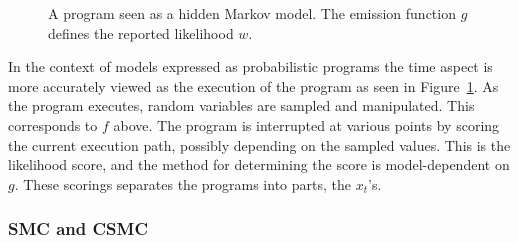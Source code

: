 \begin{figure}[h!]
\begin{center}
\end{center}
\caption{A program seen as a hidden Markov model. The emission function $g$ defines the reported likelihood $w$.}
\label{fig:hmmprog}
\end{figure}


In the context of models expressed as probabilistic programs the time aspect is more accurately viewed as the execution of the program as seen in Figure~\ref{fig:hmmprog}. As the program executes, random variables are sampled and manipulated. This corresponds to $f$ above. The program is interrupted at various points by scoring the current execution path, possibly depending on the sampled values. This is the likelihood score, and the method for determining the score is model-dependent on $g$. These scorings separates the programs into parts, the $x_t$'s.

\subsubsection{SMC and CSMC}
\label{ssub:smc_and_csmc}



